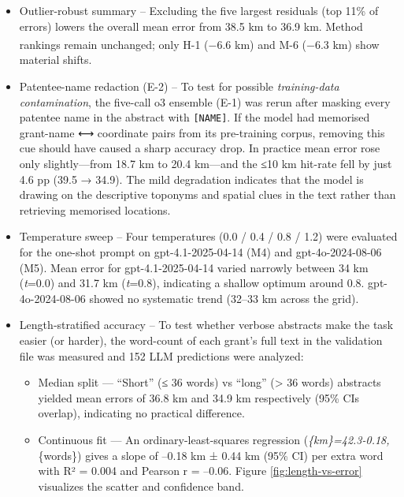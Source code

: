 \documentclass[
  10pt,
  twocolumn]{article}
\providecommand{\tightlist}{%
  \setlength{\itemsep}{0pt}\setlength{\parskip}{0pt}}
\begin{document}
\begin{itemize}
\item
  Outlier-robust summary -- Excluding the five largest residuals (top
  11\% of errors) lowers the overall mean error from 38.5 km to 36.9 km.
  Method rankings remain unchanged; only
  H-1\textsuperscript{} (−6.6 km) and
  M-6 (−6.3 km) show material shifts.
\item
  Patentee-name redaction (E-2) -- To test for possible
  \emph{training-data contamination}, the five-call o3 ensemble (E-1)
  was rerun after masking every patentee name in the abstract with
  \passthrough{\lstinline![NAME]!}. If the model had memorised
  grant-name ⟷ coordinate pairs from its pre-training corpus, removing
  this cue should have caused a sharp accuracy drop. In practice mean
  error rose only slightly---from 18.7 km to 20.4 km---and the ≤10 km
  hit-rate fell by just 4.6 pp (39.5 → 34.9). The mild degradation
  indicates that the model is drawing on the descriptive toponyms and
  spatial clues in the text rather than retrieving memorised locations.
\item
  Temperature sweep -- Four temperatures (0.0 / 0.4 / 0.8 / 1.2) were
  evaluated for the one-shot prompt on gpt-4.1-2025-04-14 (M4) and
  gpt-4o-2024-08-06 (M5). Mean error for gpt-4.1-2025-04-14 varied
  narrowly between 34 km (\emph{t}=0.0) and 31.7 km (\emph{t}=0.8),
  indicating a shallow optimum around 0.8. gpt-4o-2024-08-06 showed no
  systematic trend (32--33 km across the grid).
\item
  Length‐stratified accuracy -- To test whether verbose abstracts make
  the task easier (or harder), the word-count of each grant's full text
  in the validation file was measured and 152 LLM predictions were
  analyzed:

  \begin{itemize}
  \tightlist
  \item
    Median split --- ``Short'' (≤ 36 words) vs ``long'' (\textgreater{}
    36 words) abstracts yielded mean errors of 36.8 km and 34.9 km
    respectively (95\% CIs overlap), indicating no practical
    difference.\\
  \item
    Continuous fit --- An ordinary-least-squares regression
    (\emph{\{km\}=42.3-0.18,}\{words\}) gives a
    slope of --0.18 km ± 0.44 km (95\% CI) per extra word with R² =
    0.004 and Pearson r = --0.06. Figure \ref{fig:length-vs-error}
    visualizes the scatter and confidence band.
  \end{itemize}
\end{itemize}
\end{document}
